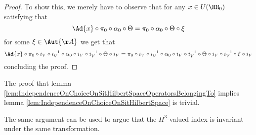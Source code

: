 \begin{proof}
	To show this, we merely have to observe that for any $x\in U(\HH_0)$ satisfying that
	\begin{equation}
		\Ad{x}\circ\pi_0\circ\alpha_0\circ\Theta =\pi_0\circ\alpha_0\circ\Theta\circ\xi
	\end{equation}
	for some $\xi\in\Aut{\AA}$ we get that
	\begin{equation}
		\Ad{x}\circ\pi_0\circ i_V\circ i_V^{-1}\circ\alpha_0\circ i_V\circ i_V^{-1}\circ\Theta\circ i_V =\pi_0\circ i_V\circ i_V^{-1}\circ\alpha_0\circ i_V\circ i_V^{-1}\circ\Theta\circ i_V\circ i_V^{-1}\circ\xi\circ i_V
	\end{equation}
	concluding the proof.
\end{proof}
The proof that lemma \ref{lem:IndependenceOnChoiceOnSitHilbertSpaceOperatorsBelongingTo} implies lemma \ref{lem:IndependenceOnChoiceOnSitHilbertSpace} is trivial.
\begin{remark}\label{rem:OnSiteUnitaryTransformationH3ValuedIndex}
	The same argument can be used to argue that the $H^3$-valued index is invariant under the same transformation.
\end{remark}
